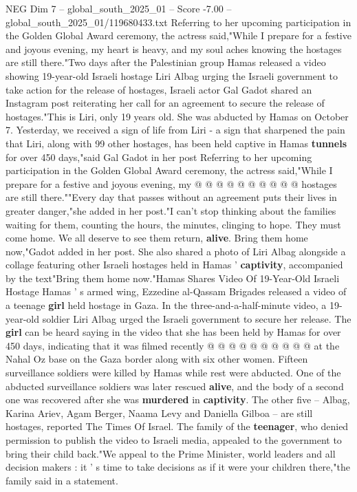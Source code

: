 \begin{textsample}{NEG Dim 7 – global\_south\_2025\_01 – Score -7.00 – global\_south\_2025\_01/119680433.txt}  \label{ex:f7_neg_195}
Referring to her upcoming participation in the Golden Global Award ceremony, the actress said,"While I prepare for a festive and joyous evening, my heart is heavy, and my soul aches knowing the hostages are still there."Two days after the Palestinian group Hamas released a video showing 19-year-old Israeli hostage Liri Albag urging the Israeli government to take action for the release of hostages, Israeli actor Gal Gadot shared an Instagram post reiterating her call for an agreement to secure the release of hostages."This is Liri, only 19 years old.
She was abducted by Hamas on October 7.
Yesterday, we received a sign of life from Liri - a sign that sharpened the pain that Liri, along with 99 other hostages, has been held captive in Hamas \textbf{tunnels} for over 450 days,"said Gal Gadot in her post Referring to her upcoming participation in the Golden Global Award ceremony, the actress said,"While I prepare for a festive and joyous evening, my @ @ @ @ @ @ @ @ @ @ hostages are still there.""Every day that passes without an agreement puts their lives in greater danger,"she added in her post."I can't stop thinking about the families waiting for them, counting the hours, the minutes, clinging to hope.
They must come home.
We all deserve to see them return, \textbf{alive}.
Bring them home now,"Gadot added in her post.
She also shared a photo of Liri Albag alongside a collage featuring other Israeli hostages held in Hamas ' \textbf{captivity}, accompanied by the text"Bring them home now."Hamas Shares Video Of 19-Year-Old Israeli Hostage Hamas ' s armed wing, Ezzedine al-Qassam Brigades released a video of a teenage \textbf{girl} held hostage in Gaza.
In the three-and-a-half-minute video, a 19-year-old soldier Liri Albag urged the Israeli government to secure her release.
The \textbf{girl} can be heard saying in the video that she has been held by Hamas for over 450 days, indicating that it was filmed recently @ @ @ @ @ @ @ @ @ @ at the Nahal Oz base on the Gaza border along with six other women.
Fifteen surveillance soldiers were killed by Hamas while rest were abducted.
One of the abducted surveillance soldiers was later rescued \textbf{alive}, and the body of a second one was recovered after she was \textbf{murdered} in \textbf{captivity}.
The other five -- Albag, Karina Ariev, Agam Berger, Naama Levy and Daniella Gilboa -- are still hostages, reported The Times Of Israel.
The family of the \textbf{teenager}, who denied permission to publish the video to Israeli media, appealed to the government to bring their child back."We appeal to the Prime Minister, world leaders and all decision makers : it ' s time to take decisions as if it were your children there,"the family said in a statement.

\end{textsample}
